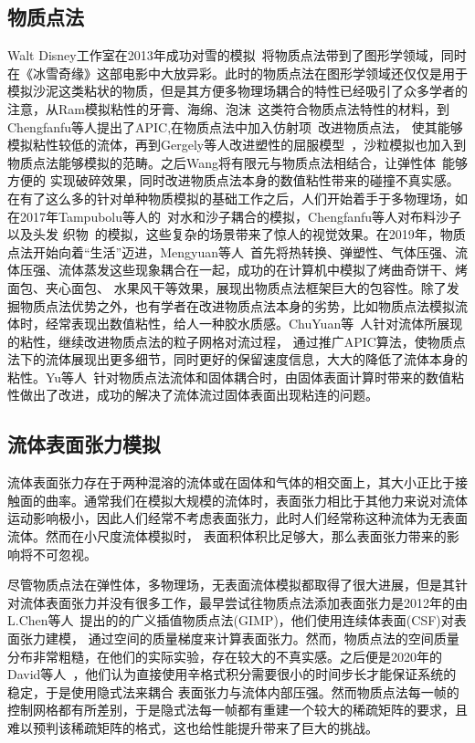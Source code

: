 \subsection{物质点法}
Walt Disney工作室在2013年成功对雪的模拟~\cite{stomakhin2013material}将物质点法带到了图形学领域，同时在《冰雪奇缘》这部电影中大放异彩。此时的物质点法在图形学领域还仅仅是用于
模拟沙泥这类粘状的物质，但是其方便多物理场耦合的特性已经吸引了众多学者的注意，从Ram模拟粘性的牙膏、海绵、泡沫~\cite{2015foams}这类符合物质点法特性的材料，到Chengfanfu等人提出了APIC,在物质点法中加入仿射项~\cite{jiang2015affine}改进物质点法，
使其能够模拟粘性较低的流体，再到Gergely等人改进塑性的屈服模型~\cite{klar2016drucker}，沙粒模拟也加入到物质点法能够模拟的范畴。之后Wang将有限元与物质点法相结合，让弹性体~\cite{2019WangDuctile}能够方便的
实现破碎效果，同时改进物质点法本身的数值粘性带来的碰撞不真实感。在有了这么多的针对单种物质模拟的基础工作之后，人们开始着手于多物理场，如在2017年Tampubolu等人的~\cite{tampubolon2017multi}对水和沙子耦合的模拟，Chengfanfu等人对布料沙子以及头发
织物~\cite{jiang2017anisotropic}的模拟，这些复杂的场景带来了惊人的视觉效果。在2019年，物质点法开始向着“生活”迈进，Mengyuan等人~\cite{Ding2019}首先将热转换、弹塑性、气体压强、流体压强、流体蒸发这些现象耦合在一起，成功的在计算机中模拟了烤曲奇饼干、烤面包、夹心面包、
水果风干等效果，展现出物质点法框架巨大的包容性。除了发掘物质点法优势之外，也有学者在改进物质点法本身的劣势，比如物质点法模拟流体时，经常表现出数值粘性，给人一种胶水质感。ChuYuan等~\cite{fu2017polynomial}人针对流体所展现的粘性，继续改进物质点法的粒子网格对流过程，
通过推广APIC算法，使物质点法下的流体展现出更多细节，同时更好的保留速度信息，大大的降低了流体本身的粘性。Yu等人~\cite{fang2020iq}针对物质点法流体和固体耦合时，由固体表面计算时带来的数值粘性做出了改进，成功的解决了流体流过固体表面出现粘连的问题。

\subsection{流体表面张力模拟}
流体表面张力存在于两种混溶的流体或在固体和气体的相交面上，其大小正比于接触面的曲率。通常我们在模拟大规模的流体时，表面张力相比于其他力来说对流体运动影响极小，因此人们经常不考虑表面张力，此时人们经常称这种流体为无表面流体。然而在小尺度流体模拟时，
表面积体积比足够大，那么表面张力带来的影响将不可忽视。

尽管物质点法在弹性体，多物理场，无表面流体模拟都取得了很大进展，但是其针对流体表面张力并没有很多工作，最早尝试往物质点法添加表面张力是2012年的由L.Chen等人~\cite{chen2012modeling}提出的的广义插值物质点法(GIMP)，他们使用连续体表面(CSF)对表面张力建模，
通过空间的质量梯度来计算表面张力。然而，物质点法的空间质量分布非常粗糙，在他们的实际实验，存在较大的不真实感。之后便是2020年的David等人~\cite{hyde2020implicit}，他们认为直接使用辛格式积分需要很小的时间步长才能保证系统的稳定，于是使用隐式法来耦合
表面张力与流体内部压强。然而物质点法每一帧的控制网格都有所差别，于是隐式法每一帧都有重建一个较大的稀疏矩阵的要求，且难以预判该稀疏矩阵的格式，这也给性能提升带来了巨大的挑战。

